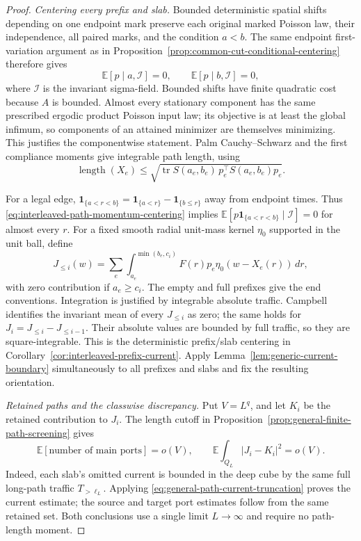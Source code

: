 \documentclass[11pt,reqno]{amsart}
\theoremstyle{definition}
\theoremstyle{remark}
\numberwithin{equation}{section}
\newcommand{\E}{\mathbb E}
\begin{document}
\begin{proof}
\emph{Centering every prefix and slab.}
Bounded deterministic spatial shifts depending on one endpoint mark
preserve each original marked Poisson law, their independence, all
paired marks, and the condition $a<b$. The same endpoint first-variation
argument as in Proposition~\ref{prop:common-cut-conditional-centering}
therefore gives
\begin{equation}
 \E[p\mid a,\mathcal I]=0,\qquad
 \E[p\mid b,\mathcal I]=0,
 \label{eq:interleaved-path-momentum-centering}
\end{equation}
where $\mathcal I$ is the invariant sigma-field. Bounded shifts have
finite quadratic cost because $A$ is bounded. Almost every stationary
component has the same prescribed ergodic product Poisson input law;
its objective is at least the global infimum, so components of an
attained minimizer are themselves minimizing. This justifies the
componentwise statement. Palm Cauchy--Schwarz and the first compliance
moments give integrable path length, using
\[
 \operatorname{length}(X_e)
       \le\sqrt{\operatorname{tr}S(a_e,b_e)\,
                         p_e^\top S(a_e,b_e)p_e}.
\]

For a legal edge,
$\mathbf1_{\{a<r<b\}}=\mathbf1_{\{a<r\}}-
\mathbf1_{\{b\le r\}}$ away from endpoint times. Thus
\eqref{eq:interleaved-path-momentum-centering} implies
$\E[p\mathbf1_{\{a<r<b\}}\mid\mathcal I]=0$ for almost every $r$.
For a fixed smooth radial unit-mass kernel $\eta_0$ supported in the
unit ball, define
\[
 J_{\le i}(w)=\sum_e\int_{a_e}^{\min(b_e,c_i)}
                 F(r)p_e\eta_0(w-X_e(r))\,dr,
\]
with zero contribution if $a_e\ge c_i$.
The empty and full prefixes give the end conventions. Integration is
justified by integrable absolute traffic. Campbell identifies the
invariant mean of every $J_{\le i}$ as zero; the same holds for
$J_i=J_{\le i}-J_{\le i-1}$. Their absolute values are bounded by
full traffic, so they are square-integrable. This is the deterministic
prefix/slab centering in Corollary~\ref{cor:interleaved-prefix-current}.
Apply Lemma~\ref{lem:generic-current-boundary} simultaneously to all
prefixes and slabs and fix the resulting orientation.

\emph{Retained paths and the classwise discrepancy.}
Put $V=L^q$, and let $K_i$ be the retained contribution to $J_i$.
The length cutoff in
Proposition~\ref{prop:general-finite-path-screening} gives
\begin{equation}
 \E[\text{number of main ports}]=o(V),\qquad
 \E\int_{Q_L}|J_i-K_i|^2=o(V).
 \label{eq:interleaved-path-retention}
\end{equation}
Indeed, each slab's omitted current is bounded in the deep cube by
the same full long-path traffic $T_{>\ell_L}$. Applying
\eqref{eq:general-path-current-truncation} proves the current estimate;
the source and target port estimates follow from the same retained
set. Both conclusions use a single limit $L\to\infty$ and require
no path-length moment.


\end{proof}
\end{document}
